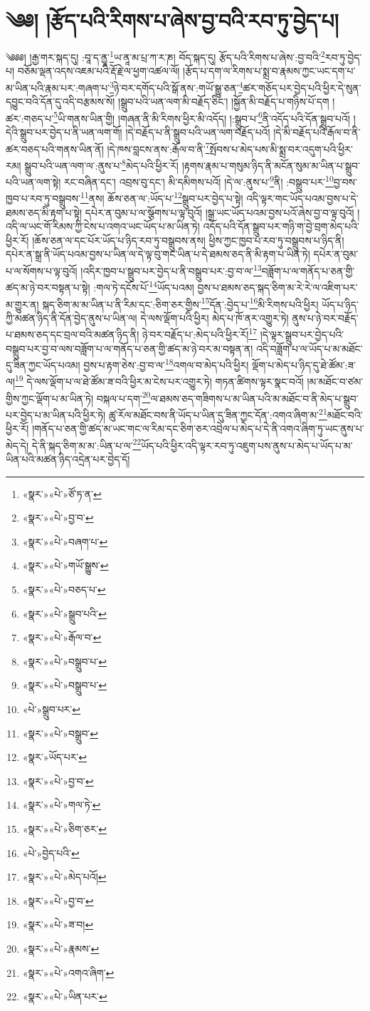 \chapter{༄༅། །རྩོད་པའི་རིགས་པ་ཞེས་བྱ་བའི་རབ་ཏུ་བྱེད་པ།}༄༅༅། །རྒྱ་གར་སྐད་དུ། :བཱ་ད་ནྱཱ་\footnote{«སྣར་»«པེ་»ཙོ་ཏ་ན་}ཡ་ནཱ་མ་པྲ་ཀ་ར་ཎ། བོད་སྐད་དུ། རྩོད་པའི་རིགས་པ་ཞེས་:བྱ་བའི་\footnote{«སྣར་»«པེ་»བྱ་བ་}རབ་ཏུ་བྱེད་པ། བཅོམ་ལྡན་འདས་འཇམ་པའི་རྡོ་རྗེ་ལ་ཕྱག་འཚལ་ལོ། །རྩོད་པ་དག་ལ་རིགས་པ་སྨྲ་བ་རྣམས་ཀྱང་ཡང་དག་པ་མ་ཡིན་པའི་རྣམ་པར་:གཞག་པ་\footnote{«སྣར་»«པེ་»བཞག་པ་}ཉེ་བར་དགོད་པའི་སྒོ་ནས་:གཡོ་སྒྱུ་ཅན་\footnote{«སྣར་»«པེ་»གཡོ་སྒྱུས་}ཚར་གཅོད་པར་བྱེད་པའི་ཕྱིར་དེ་སུན་དབྱུང་བའི་དོན་དུ་འདི་བརྩམས་སོ། །སྒྲུབ་པའི་ཡན་ལག་མི་བརྗོད་ཅིང་། །སྐྱོན་མི་བརྗོད་པ་གཉིས་པོ་དག །ཚར་:གཅད་པ་\footnote{«སྣར་»«པེ་»བཅད་པ་}ཡི་གནས་ཡིན་གྱི། །གཞན་ནི་མི་རིགས་ཕྱིར་མི་འདོད། །:སྒྲུབ་པ་\footnote{«སྣར་»«པེ་»སྒྲུབ་པའི་}ནི་འདོད་པའི་དོན་སྒྲུབ་པའོ། །དེའི་སྒྲུབ་པར་བྱེད་པ་ནི་ཡན་ལག་གོ། །དེ་བརྗོད་པ་ནི་སྒྲུབ་པའི་ཡན་ལག་བརྗོད་པའོ། །དེ་མི་བརྗོད་པའི་རྒོལ་བ་ནི་ཚར་བཅད་པའི་གནས་ཡིན་ནོ། །དེ་ཁས་བླངས་ནས་:རྒོལ་བ་ནི་\footnote{«སྣར་»«པེ་»རྒོལ་བ་}སྤོབས་པ་མེད་པས་མི་སྨྲ་བར་འདུག་པའི་ཕྱིར་རམ། སྒྲུབ་པའི་ཡན་ལག་ལ་:ནུས་པ་\footnote{«སྣར་»«པེ་»བསྒྲུབ་པ་}མེད་པའི་ཕྱིར་རོ། །རྟགས་རྣམ་པ་གསུམ་ཉིད་ནི་མངོན་སུམ་མ་ཡིན་པ་སྒྲུབ་པའི་ཡན་ལག་སྟེ། རང་བཞིན་དང་། འབྲས་བུ་དང་། མི་དམིགས་པའོ། །དེ་ལ་:ནུས་པ་\footnote{«སྣར་»«པེ་»བསྒྲུབ་པ་}ནི། :བསྒྲུབ་པར་\footnote{«པེ་»སྒྲུབ་པར་}བྱ་བས་ཁྱབ་པ་རབ་ཏུ་བསྒྲུབས་\footnote{«སྣར་»«པེ་»བསྒྲུབ་}ནས། ཆོས་ཅན་ལ་:ཡོད་པ་\footnote{«སྣར་»ཡོད་པར་}སྒྲུབ་པར་བྱེད་པ་སྟེ། འདི་ལྟར་གང་ཡོད་པའམ་བྱས་པ་དེ་ཐམས་ཅད་མི་རྟག་པ་སྟེ། དཔེར་ན་བུམ་པ་ལ་སྩོགས་པ་ལྟ་བུའོ། །སྒྲ་ཡང་ཡོད་པའམ་བྱས་པའོ་ཞེས་བྱ་བ་ལྟ་བུའོ། །འདི་ལ་ཡང་གོ་རིམས་ཀྱི་ངེས་པ་འགའ་ཡང་ཡོད་པ་མ་ཡིན་ཏེ། འདོད་པའི་དོན་སྒྲུབ་པར་གཉི་ག་བྱེ་བྲག་མེད་པའི་ཕྱིར་རོ། །ཆོས་ཅན་ལ་དང་པོར་ཡོད་པ་ཉིད་རབ་ཏུ་བསྒྲུབས་ནས། ཕྱིས་ཀྱང་ཁྱབ་པ་རབ་ཏུ་བསྒྲུབས་པ་ཉིད་ནི། དཔེར་ན་སྒྲ་ནི་ཡོད་པའམ་བྱས་པ་ཡིན་ལ་དེ་ལྟ་བུ་གང་ཡིན་པ་དེ་ཐམས་ཅད་ནི་མི་རྟག་པ་ཡིན་ཏེ། དཔེར་ན་བུམ་པ་ལ་སོགས་པ་ལྟ་བུའོ། །འདིར་ཁྱབ་པ་སྒྲུབ་པར་བྱེད་པ་ནི་བསྒྲུབ་པར་:བྱ་བ་ལ་\footnote{«སྣར་»«པེ་»བྱ་བ་}བཟློག་པ་ལ་གནོད་པ་ཅན་གྱི་ཚད་མ་ཉེ་བར་བསྟན་པ་སྟེ། :གལ་ཏེ་དངོས་པོ་\footnote{«སྣར་»«པེ་»གལ་ཏེ་}ཡོད་པའམ། བྱས་པ་ཐམས་ཅད་སྐད་ཅིག་མ་རེ་རེ་ལ་འཇིག་པར་མ་གྱུར་ན། སྐད་ཅིག་མ་མ་ཡིན་པ་ནི་རིམ་དང་:ཅིག་ཅར་གྱིས་\footnote{«སྣར་»«པེ་»ཅིག་ཅར་}དོན་:བྱེད་པ་\footnote{«པེ་»བྱེད་པའི་}མི་རིགས་པའི་ཕྱིར། ཡོད་པ་ཉིད་ཀྱི་མཚན་ཉིད་ནི་དོན་བྱེད་ནུས་པ་ཡིན་ལ། དེ་ལས་ལྡོག་པའི་ཕྱིར། མེད་པ་ཁོ་ནར་འགྱུར་ཏེ། ནུས་པ་ཉེ་བར་བརྗོད་པ་ཐམས་ཅད་དང་བྲལ་བའི་མཚན་ཉིད་ནི། ཉེ་བར་བརྗོད་པ་:མེད་པའི་ཕྱིར་རོ།\footnote{«སྣར་»«པེ་»མེད་པའོ།} །དེ་ལྟར་སྒྲུབ་པར་བྱེད་པའི་བསྒྲུབ་པར་བྱ་བ་ལས་བཟློག་པ་ལ་གནོད་པ་ཅན་གྱི་ཚད་མ་ཉེ་བར་མ་བསྟན་ན། འདི་བཟློག་པ་ལ་ཡོད་པ་མ་མཐོང་དུ་ཟིན་ཀྱང་ཡོད་པའམ། བྱས་པ་རྟག་ཅེས་:བྱ་བ་ལ་\footnote{«སྣར་»«པེ་»བྱ་བ་}འགལ་བ་མེད་པའི་ཕྱིར། ལྡོག་པ་མེད་པ་ཉིད་དུ་ཐེ་ཚོམ་:ཟ་ལ།\footnote{«སྣར་»«པེ་»ཟ་བ།} དེ་ལས་ལྡོག་པ་ལ་ཐེ་ཚོམ་ཟ་བའི་ཕྱིར་མ་ངེས་པར་འགྱུར་ཏེ། གཏན་ཚིགས་ལྟར་སྣང་བའོ། །མ་མཐོང་བ་ཙམ་གྱིས་ཀྱང་ལྡོག་པ་མ་ཡིན་ཏེ། བསྐལ་པ་དག་\footnote{«སྣར་»«པེ་»རྣམས་}ལ་ཐམས་ཅད་གཟིགས་པ་མ་ཡིན་པའི་མ་མཐོང་བ་ནི་མེད་པ་སྒྲུབ་པར་བྱེད་པ་མ་ཡིན་པའི་ཕྱིར་ཏེ། ཚུ་རོལ་མཐོང་བས་ནི་ཡོད་པ་ཡིན་དུ་ཟིན་ཀྱང་དོན་:འགའ་ཞིག་མ་\footnote{«སྣར་»«པེ་»འགའ་ཞིག་}མཐོང་བའི་ཕྱིར་རོ། །གནོད་པ་ཅན་གྱི་ཚད་མ་ཡང་གང་ལ་རིམ་དང་ཅིག་ཅར་འབྲེལ་པ་མེད་པ་དེ་ནི་འགའ་ཞིག་ཏུ་ཡང་ནུས་པ་མེད་དེ། དེ་ནི་སྐད་ཅིག་མ་མ་:ཡིན་པ་ལ་\footnote{«སྣར་»«པེ་»ཡིན་པར་}ཡོད་པའི་ཕྱིར་འདི་ལྟར་རབ་ཏུ་འཇུག་པས་ནུས་པ་མེད་པ་ཡོད་པ་མ་ཡིན་པའི་མཚན་ཉིད་འདྲེན་པར་བྱེད་དོ། 